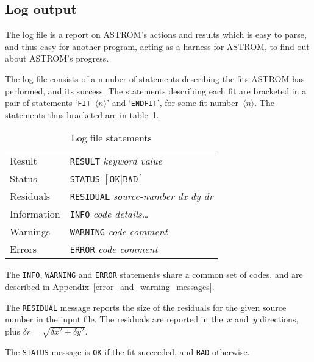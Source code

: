 \documentclass[twoside,11pt]{article}
\newcommand{\xlabel}[1]{}
\renewcommand{\_}{\texttt{\symbol{95}}}
\begin{document}
\subsection{\xlabel{output_log}Log output}
\label{output_log}

The log file is a report on ASTROM's actions and results which is easy
to parse, and thus easy for another program, acting as a harness for
ASTROM, to find out about ASTROM's progress.

The log file consists of a number of statements describing the fits
ASTROM has performed, and its success.  The statements describing each
fit are bracketed in a pair of statements `\texttt{FIT }$\langle
n\rangle$' and `\texttt{ENDFIT}', for some fit number~$\langle n\rangle$.
The statements thus bracketed are in table~\ref{t:logstatements}.
\begin{table}
\begin{center}
\begin{tabular}{|l|l|}
\hline
Result & \texttt{RESULT} \textit{keyword value} \\
Status & \texttt{STATUS} $[\texttt{OK} | \texttt{BAD}]$ \\
Residuals & \texttt{RESIDUAL} \textit{source-number dx dy dr} \\
Information & \texttt{INFO} \textit{code details\dots} \\
Warnings & \texttt{WARNING} \textit{code comment} \\
Errors & \texttt{ERROR} \textit{code comment} \\
\hline
\end{tabular}
\end{center}
\caption{\label{t:logstatements}Log file statements}
\end{table}

The \texttt{INFO}, \texttt{WARNING} and \texttt{ERROR} statements
share a common set of codes, and are described in
Appendix~\ref{error_and_warning_messages}.

The \texttt{RESIDUAL} message reports the size of the residuals for
the given source number in the input file.  The residuals are reported
in the~$x$ and~$y$ directions, plus $\delta r=\sqrt{\delta x^2+\delta
y^2}$.

The \texttt{STATUS} message is \texttt{OK} if the fit succeeded, and
\texttt{BAD} otherwise.
\end{document}

